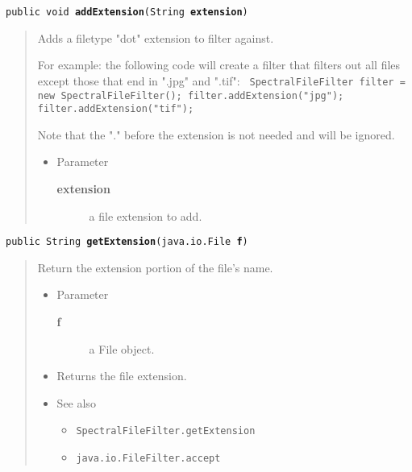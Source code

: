 \documentclass[twoside,11pt,nolof]{starlink}
\providecommand{\refdefined}[1]{}
\providecommand{\method}[1]{\texttt{#1}}
\newenvironment{desc}{\begin{quote}}{\end{quote}}
\begin{document}
\method{public void \textbf{addExtension}(\texttt{String} \textbf{extension})\label{l253}\label{l254}}
\begin{desc}Adds a filetype "dot" extension to filter against.

 For example: the following code will create a filter that filters
 out all files except those that end in ".jpg" and ".tif":
 \texttt{
\mbox{}\newline
   SpectralFileFilter filter = new SpectralFileFilter();\mbox{}\newline
   filter.addExtension("jpg");\mbox{}\newline
   filter.addExtension("tif");\mbox{}\newline
 }

 Note that the "." before the extension is not needed and will
 be ignored.
\begin{itemize}
\item{Parameter
  \begin{description}
   \item[\textbf{extension}]{a file extension to add.}
  \end{description}}
\end{itemize}
\end{desc}

\method{public String \textbf{getExtension}(\texttt{java.io.File} \textbf{f})\label{l255}\label{l256}}
\begin{desc}Return the extension portion of the file's name.
\begin{itemize}
\item{Parameter
  \begin{description}
   \item[\textbf{f}]{a File object.}
  \end{description}}
\end{itemize}
\begin{itemize}
\item{Returns the file extension. }
\item{{See also}
  \begin{itemize}
   \item{\texttt{SpectralFileFilter.getExtension} {
\refdefined{l257}}
}
   \item{\texttt{java.io.FileFilter.accept} {
\refdefined{l258}}
}
  \end{itemize}
}
\end{itemize}
\end{desc}

\clearpage
\end{document}
